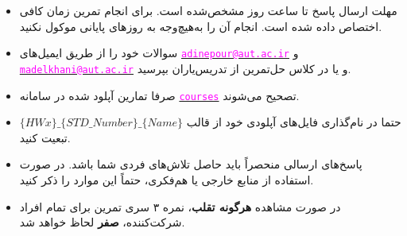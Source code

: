 \begin{itemize}
	\small
	\setlength\itemsep{0.05em}
	\item
	مهلت ارسال پاسخ تا ساعت  روز مشخص‌شده است. ﺑﺮای اﻧﺠﺎم ﺗﻤﺮﯾﻦ زﻣﺎن کافی اختصاص‌ داده ‌شده اﺳﺖ. انجام آن را به‌هیچ‌وجه ﺑﻪ روزﻫﺎی پایانی موکول نکنید.
	\item 
	سوالات خود را از طریق ایمیل‌های \href{mailto:adinepour@aut.ac.ir}{\textcolor{magenta}{\texttt{adinepour@aut.ac.ir}}} و \href{mailto:madelkhani@aut.ac.ir}{\textcolor{magenta} {\texttt{madelkhani@aut.ac.ir}}} و یا در کلاس حل‌تمرین از تدریس‌یاران بپرسید.
	\item 
	صرفا تمارین آپلود شده در سامانه \href{https://courses.aut.ac.ir/}{\textcolor{magenta}{\texttt{courses}}} تصحیح می‌شوند.
	
	\item 
	حتما در نام‌گذاری فایل‌های آپلودی خود از قالب
	 $\{HWx\}\_\{STD\_Number\}\_\{Name\}$ 
	 تبعیت کنید.
	
	
	\item
	پاسخ‌های ارسالی منحصراً باید حاصل تلاش‌های فردی شما باشد. در صورت استفاده از منابع خارجی یا هم‌فکری، حتماً این موارد را ذکر کنید.
	
	\item 
	در صورت مشاهده \textbf{هرگونه تقلب}، نمره ۳ سری تمرین برای تمام افراد شرکت‌کننده، \textbf{صفر} لحاظ خواهد شد.
\end{itemize}